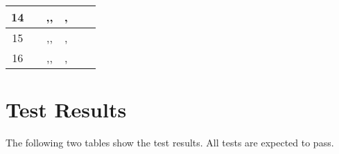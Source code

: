 \begin{table}[htbp]
\begin{tabular}{ c | c | c | c | c | c }
		14 
		& 
		&,,
		&,
		&
		&	   \\ \hline
		
		15 
		& 
		&,,
		&,
		&
		&	   \\ \hline
		
		16 
		& 
		&,,
		&,
		&
		&	   \\ \hline
		
		\hline\hline
		

	\end{tabular}
\end{table}




\section{Test Results}
The following two tables show the test results.  All tests are expected to pass.



